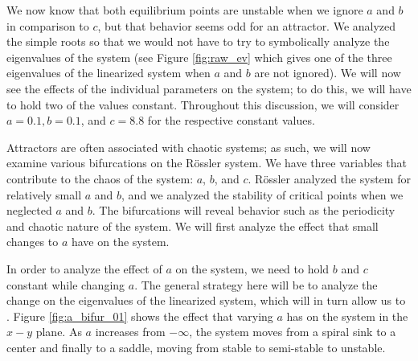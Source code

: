 \documentclass{article}
\begin{document}
We now know that both equilibrium points are unstable when we ignore $a$ and $b$ in comparison to $c$, but that behavior seems odd for an attractor. We analyzed the simple roots so that we would not have to try to symbolically analyze the eigenvalues of the system (see Figure \ref{fig:raw_ev} which gives one of the three eigenvalues of the linearized system when $a$ and $b$ are not ignored). We will now see the effects of the individual parameters on the system; to do this, we will have to hold two of the values constant. Throughout this discussion, we will consider $a=0.1, b=0.1$, and $c=8.8$ for the respective constant values.

Attractors are often associated with chaotic systems; as such, we will now examine various bifurcations on the R\"{o}ssler system. We have three variables that contribute to the chaos of the system: $a$, $b$, and $c$. R\"{o}ssler analyzed the system for relatively small $a$ and $b$, and we analyzed the stability of critical points when we neglected $a$ and $b$. The bifurcations will reveal behavior such as the periodicity and chaotic nature of the system. We will first analyze the effect that small changes to $a$ have on the system.

In order to analyze the effect of $a$ on the system, we need to hold $b$ and $c$ constant while changing $a$. The general strategy here will be to analyze the change on the eigenvalues of the linearized system, which will in turn allow us to . Figure \ref{fig:a_bifur_01} shows the effect that varying $a$ has on the system in the $x-y$ plane. As $a$ increases from $-\infty$, the system moves from a spiral sink to a center and finally to a saddle, moving from stable to semi-stable to unstable.
\end{document}
